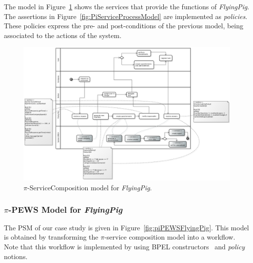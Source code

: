 \documentclass{singlecol-new}
\theoremstyle{TH}{
\newtheorem{lemma}{Lemma}
\newtheorem{theorem}[lemma]{Theorem}
\newtheorem{corrolary}[lemma]{Corrolary}
\newtheorem{conjecture}[lemma]{Conjecture}
\newtheorem{proposition}[lemma]{Proposition}
\newtheorem{claim}[lemma]{Claim}
\newtheorem{stheorem}[lemma]{Wrong Theorem}
\newtheorem{algorithm}{Algorithm}
}
\theoremstyle{THrm}{
\newtheorem{definition}{Definition}[section]
\newtheorem{question}{Question}[section]
\newtheorem{remark}{Remark}
\newtheorem{scheme}{Scheme}
}
\theoremstyle{THhit}{
\newtheorem{case}{Case}[section]
}
\theoremstyle{THhsl}{
\newtheorem{example}{Example}
}
\def\FlyingPig{\textsl{FlyingPig}\xspace}
\begin{document}
The model in Figure~\ref{fig:PiServiceCompositionModel}
shows  the services that provide the functions of \FlyingPig.
The assertions in Figure~\ref{fig:PiServiceProcessModel} are implemented as \textit{policies}.
These policies express the pre- and post-conditions of the previous model, being  associated to the actions of the system.

\begin{figure}[h]
\centering
\includegraphics[width=1.0\textwidth]{./figures/ServiceCompositionGeneralCut}
\caption{$\pi$-ServiceComposition model for \FlyingPig.\label{fig:PiServiceCompositionModel}}
\end{figure}


\subsubsection{$\pi$-PEWS Model for \FlyingPig}

The  PSM of our case study is given in Figure~\ref{fig:piPEWSFlyingPig}. This model is obtained by transforming the $\pi$-service composition model into a workflow.
Note that this workflow is implemented by using  {BPEL constructors}~\cite{ws-bpel2} and \textit{policy} notions.
\end{document}
